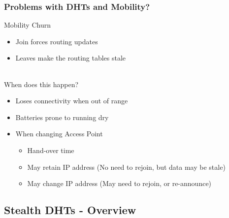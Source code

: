\documentclass{beamer}
\begin{document}
\begin{frame}
  \frametitle{Problems with DHTs and Mobility?}

    Mobility Churn\\
    \begin{itemize}
        \item Join forces routing updates
        \item Leaves make the routing tables stale
    \end{itemize}
    ~\\
    When does this happen?
    \begin{itemize}
        \item Loses connectivity when out of range
        \item Batteries prone to running dry
        \item When changing Access Point
            \begin{itemize}
                \item Hand-over time
                \item May retain IP address (No need to rejoin, but data may be stale)
                \item May change IP address (May need to rejoin, or re-announce)
            \end{itemize}
    \end{itemize}

\end{frame}

\subsection[Stealth DHTs - Overview]{Stealth DHTs - Overview}


\end{document}
